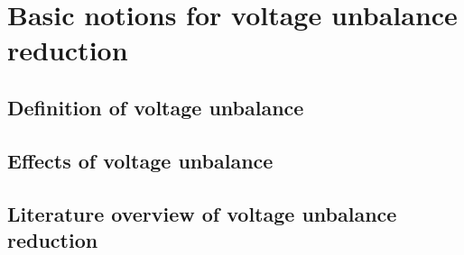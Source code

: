 \section{Basic notions for voltage unbalance reduction}

	\subsection{Definition of voltage unbalance}

	\subsection{Effects of voltage unbalance}

	\subsection{Literature overview of voltage unbalance reduction}
%



%


